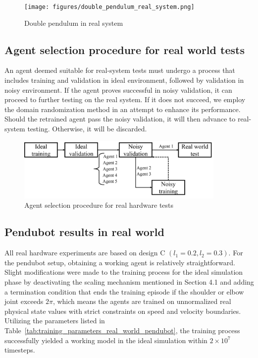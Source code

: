 \begin{figure}[H]
    \centering
    \texttt{[image: figures/double\_pendulum\_real\_system.png]}
    \caption{Double pendulum in real system}
    \label{fig:double_pendulum_real_system}
\end{figure}

\subsection{Agent selection procedure for real world tests}
An agent deemed suitable for real-system tests must undergo a process that includes training and validation in ideal environment, followed by validation in noisy environment. If the agent proves successful in noisy validation, it can proceed to further testing on the real system. If it does not succeed, we employ the domain randomization method in an attempt to enhance its performance. Should the retrained agent pass the noisy validation, it will then advance to real-system testing. Otherwise, it will be discarded.

\begin{figure}[H]
    \centering
    \includegraphics[width=0.9\textwidth]{figures/hardware_result/agent_selection_procedure.png}%
    \caption{Agent selection procedure for real hardware tests}
    \label{fig:agent_selection}
\end{figure}

\subsection{Pendubot results in real world}
All real hardware experiments are based on design C \( (l_1 = 0.2, l_2 = 0.3) \). For the pendubot setup, obtaining a working agent is relatively straightforward. Slight modifications were made to the training process for the ideal simulation phase by deactivating the scaling mechanism mentioned in Section 4.1 and adding a termination condition that ends the training episode if the shoulder or elbow joint exceeds \( 2\pi \), which means the agents are trained on unnormalized real physical state values with strict constraints on speed and velocity boundaries. Utilizing the parameters listed in Table~\ref{tab:training_parameters_real_world_pendubot}, the training process successfully yielded a working model in the ideal simulation within \( 2 \times 10^7 \) timesteps.

